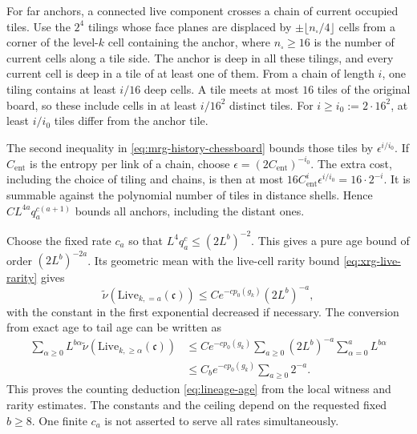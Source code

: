 \documentclass[11pt,letterpaper,reqno]{amsart}
\theoremstyle{definition}
\theoremstyle{remark}
\begin{document}
For far anchors, a connected live component crosses a chain of
current occupied tiles. Use the $2^4$ tilings whose face planes
are displaced by $\pm\lfloor n_\square/4\rfloor$ cells from a
corner of the level-$k$ cell containing the anchor, where
$n_\square\ge16$ is the number of current cells along a tile
side. The anchor is deep in all these tilings, and every current
cell is deep in a tile of at least one of them. From a chain
of length $i$, one tiling contains at least $i/16$ deep cells.
A tile meets at most $16$ tiles of the original board, so these
include cells in at least $i/16^2$ distinct tiles. For
$i\ge i_0:=2\cdot16^2$, at least $i/i_0$ tiles differ from the
anchor tile.

The second inequality in
\eqref{eq:mrg-history-chessboard} bounds those tiles by
$\epsilon^{i/i_0}$. If $C_{\mathrm{ent}}$ is the entropy per
link of a chain, choose
$\epsilon=(2C_{\mathrm{ent}})^{-i_0}$. The extra cost, including
the choice of tiling and chains, is then at most
$16C_{\mathrm{ent}}^i\epsilon^{i/i_0}=16\cdot2^{-i}$.
It is summable against the polynomial number of tiles in distance
shells. Hence $CL^{4a}q_a^{c(a+1)}$ bounds all anchors, including
the distant ones.

Choose the fixed rate $c_a$ so that
$L^4q_a^c\le(2L^b)^{-2}$. This gives a pure age bound of order
$(2L^b)^{-2a}$. Its geometric mean with the live-cell rarity
bound \eqref{eq:xrg-live-rarity} gives
\[
 \widetilde\nu(\mathrm{Live}_{k,=a}(\mathfrak c))
       \le Ce^{-cp_0(g_k)}(2L^b)^{-a},
\]
with the constant in the first exponential decreased if necessary.
The conversion from exact age to tail age can be written as
\[
 \begin{split}
 \sum_{\alpha\ge0}L^{b\alpha}
       \widetilde\nu(\mathrm{Live}_{k,\ge\alpha}(\mathfrak c))
 &\le Ce^{-cp_0(g_k)}
       \sum_{a\ge0}(2L^b)^{-a}
                         \sum_{\alpha=0}^aL^{b\alpha}\\
 &\le C_be^{-cp_0(g_k)}\sum_{a\ge0}2^{-a}.
 \end{split}
\]
This proves the counting deduction \eqref{eq:lineage-age} from
the local witness and rarity estimates. The constants and the
ceiling depend on the requested fixed $b\ge8$. One finite
$c_a$ is not asserted to serve all rates simultaneously.
\end{document}
